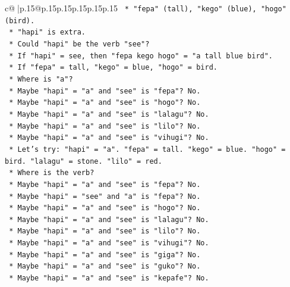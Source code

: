 \documentclass{article}
\begin{document}
{\begin{supertabular}{c@{$\;$}|p{.15\linewidth}@{}p{.15\linewidth}p{.15\linewidth}p{.15\linewidth}p{.15\linewidth}p{.15\linewidth}}
{{{\texttt{                        *   "fepa" (tall), "kego" (blue), "hogo" (bird).} \\
\texttt{                        *   "hapi" is extra.} \\
\texttt{                        *   Could "hapi" be the verb "see"?} \\
\texttt{                        *   If "hapi" = see, then "fepa kego hogo" = "a tall blue bird".} \\
\texttt{                        *   If "fepa" = tall, "kego" = blue, "hogo" = bird.} \\
\texttt{                        *   Where is "a"?} \\
\texttt{                        *   Maybe "hapi" = "a" and "see" is "fepa"? No.} \\
\texttt{                        *   Maybe "hapi" = "a" and "see" is "hogo"? No.} \\
\texttt{                        *   Maybe "hapi" = "a" and "see" is "lalagu"? No.} \\
\texttt{                        *   Maybe "hapi" = "a" and "see" is "lilo"? No.} \\
\texttt{                        *   Maybe "hapi" = "a" and "see" is "vihugi"? No.} \\
\texttt{                        *   Let's try: "hapi" = "a". "fepa" = tall. "kego" = blue. "hogo" = bird. "lalagu" = stone. "lilo" = red.} \\
\texttt{                        *   Where is the verb?} \\
\texttt{                        *   Maybe "hapi" = "a" and "see" is "fepa"? No.} \\
\texttt{                        *   Maybe "hapi" = "see" and "a" is "fepa"? No.} \\
\texttt{                        *   Maybe "hapi" = "a" and "see" is "hogo"? No.} \\
\texttt{                        *   Maybe "hapi" = "a" and "see" is "lalagu"? No.} \\
\texttt{                        *   Maybe "hapi" = "a" and "see" is "lilo"? No.} \\
\texttt{                        *   Maybe "hapi" = "a" and "see" is "vihugi"? No.} \\
\texttt{                        *   Maybe "hapi" = "a" and "see" is "giga"? No.} \\
\texttt{                        *   Maybe "hapi" = "a" and "see" is "guko"? No.} \\
\texttt{                        *   Maybe "hapi" = "a" and "see" is "kepafe"? No.} \\
}}}
\end{supertabular}}
\end{document}
